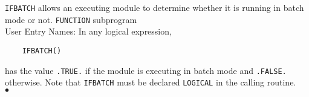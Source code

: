                        
\Submitter{}                      
{\tt IFBATCH} allows an executing module to determine whether it
is running in batch mode or not.
\Structure
{\tt FUNCTION} subprogram \\
User Entry Names: 
\Usage
In any logical expression,
\begin{verbatim}
    IFBATCH()
\end{verbatim}
has the value {\tt .TRUE.} if the module is executing in batch mode
and {\tt .FALSE.} otherwise. Note that {\tt IFBATCH}
must be declared {\tt LOGICAL} in the calling routine.
\\ $\bullet$
